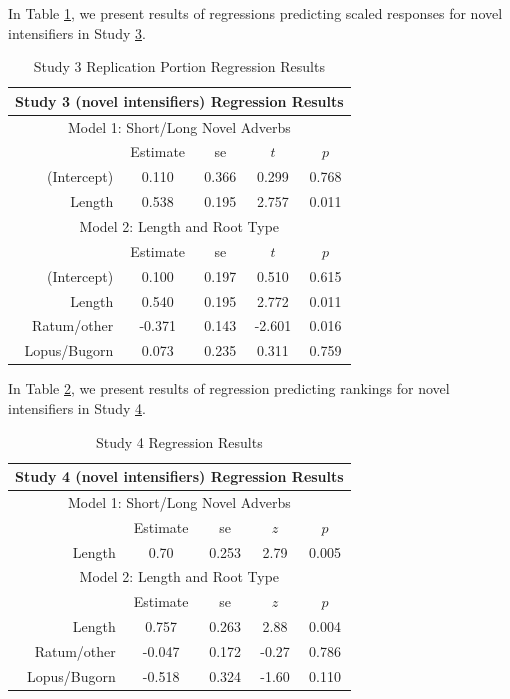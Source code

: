 \begin{appendices}
In Table \ref{table:3rep}, we present results of regressions predicting scaled responses for novel intensifiers in Study \hyperref[sec:study3]{3}.

\begin{table}[h]
\center
\footnotesize
\begin{tabular}{r|cccc}
\hline
\hline
\multicolumn{5}{c}{\textbf{Study 3 (novel intensifiers) Regression Results}} \\
\hline
\hline
\multicolumn{5}{c}{Model 1: Short/Long Novel Adverbs} \\
& Estimate & se & $t$ & $p$ \\
\hline
(Intercept) &  0.110 & 0.366 & 0.299 & 0.768 \\
Length &  0.538 & 0.195 & 2.757 & 0.011 \\
\hline
\hline
\multicolumn{5}{c}{Model 2: Length and Root Type} \\
& Estimate & se & $t$ & $p$ \\
\hline
(Intercept) & 0.100  & 0.197 & 0.510 & 0.615 \\
Length & 0.540  & 0.195 &   2.772 & 0.011 \\
Ratum/other & -0.371  & 0.143 &  -2.601 & 0.016 \\
Lopus/Bugorn &  0.073  & 0.235 &   0.311 & 0.759 \\
\hline
\hline
\end{tabular}
\caption{Study 3 Replication Portion Regression Results}
\label{table:3rep}
\end{table}


In Table \ref{table:4}, we present results of regression predicting rankings for novel intensifiers in Study \hyperref[sec:study4]{4}.

\begin{table}[h]
\center
\footnotesize
\begin{tabular}{r|cccc}
\hline
\hline
\multicolumn{5}{c}{\textbf{Study 4 (novel intensifiers) Regression Results}} \\
\hline
\hline
\multicolumn{5}{c}{Model 1: Short/Long Novel Adverbs} \\
& Estimate & se & $z$ & $p$ \\
\hline
Length & 0.70 & 0.253 & 2.79 & 0.005 \\
\hline
\hline
\multicolumn{5}{c}{Model 2: Length and Root Type} \\
& Estimate & se & $z$ & $p$ \\
\hline
Length       &  0.757 & 0.263 &  2.88 & 0.004 \\
Ratum/other  & -0.047 & 0.172 & -0.27 & 0.786 \\ 
Lopus/Bugorn & -0.518 & 0.324 & -1.60 & 0.110 \\
\hline
\hline
\end{tabular}
\caption{Study 4 Regression Results}
\label{table:4}
\end{table}


\end{appendices}
